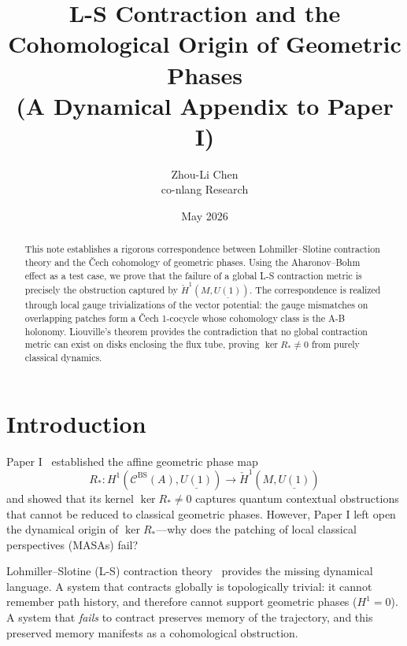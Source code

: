 \documentclass[11pt]{article}
\begin{document}
\title{L-S Contraction and the Cohomological Origin of Geometric Phases\\
{\large (A Dynamical Appendix to Paper I)}}

\author{Zhou-Li Chen \\ co-nlang Research}
\date{May 2026}

\maketitle

\begin{abstract}
This note establishes a rigorous correspondence between Lohmiller--Slotine contraction theory and the \v{C}ech cohomology of geometric phases. Using the Aharonov--Bohm effect as a test case, we prove that the failure of a global L-S contraction metric is precisely the obstruction captured by $\check{H}^1(M, \underline{U(1)})$. The correspondence is realized through local gauge trivializations of the vector potential: the gauge mismatches on overlapping patches form a \v{C}ech 1-cocycle whose cohomology class is the A-B holonomy. Liouville's theorem provides the contradiction that no global contraction metric can exist on disks enclosing the flux tube, proving $\ker R_* \neq 0$ from purely classical dynamics.
\end{abstract}

\section{Introduction}
\label{sec:introduction}

Paper I~\cite{PaperI} established the affine geometric phase map
\[
R_* : H^1(\mathcal{C}^{\mathrm{BS}}(A), \underline{U(1)}) \to \check{H}^1(M, \underline{U(1)})
\]
and showed that its kernel $\ker R_* \neq 0$ captures quantum contextual obstructions that cannot be reduced to classical geometric phases. However, Paper I left open the dynamical origin of $\ker R_*$---why does the patching of local classical perspectives (MASAs) fail?

Lohmiller--Slotine (L-S) contraction theory~\cite{LohmillerSlotine1998} provides the missing dynamical language. A system that contracts globally is topologically trivial: it cannot remember path history, and therefore cannot support geometric phases ($H^1 = 0$). A system that \emph{fails} to contract preserves memory of the trajectory, and this preserved memory manifests as a cohomological obstruction.
\end{document}
